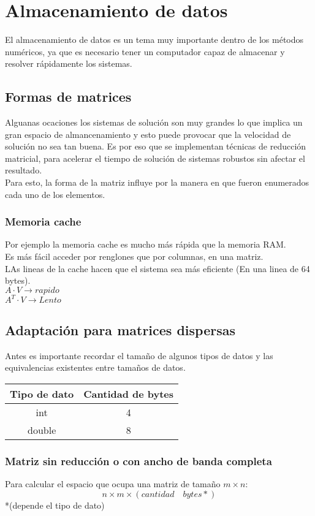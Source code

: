 \chapter{Almacenamiento de datos }
El almacenamiento de datos es un tema muy importante dentro de los m\'etodos num\'ericos, ya que es necesario tener un computador capaz de almacenar y resolver r\'apidamente los sistemas.

\section{Formas de matrices}
Alguanas ocaciones los sistemas de soluci\'on son muy grandes lo que implica un gran espacio de almancenamiento y esto puede provocar que la velocidad de soluci\'on no sea tan buena. Es por eso que se implementan t\'ecnicas de reducci\'on matricial, para acelerar el tiempo de soluci\'on de sistemas robustos sin afectar el resultado.\\
Para esto, la forma de la matriz influye por la manera en que fueron enumerados cada uno de los elementos.

\subsection{Memoria cache}
Por ejemplo la memoria cache es mucho m\'as r\'apida que la memoria RAM.\\
Es m\'as f\'acil acceder por renglones que por columnas, en una matriz.\\
LAs lineas de la cache hacen que el sistema sea más eficiente (En una linea de 64 bytes).\\
$A\cdot V \rightarrow rapido$\\
$A^T\cdot V\rightarrow Lento$

\section{Adaptaci\'on para matrices dispersas}
Antes es importante recordar el tamaño de algunos tipos de datos y las equivalencias existentes entre tamaños de datos. 
\begin{tabular}{| c | c |}
\hline
Tipo de dato & Cantidad de bytes \\
\hline
int & 4 \\
double & 8\\
\hline
\end{tabular}
\subsection{Matriz sin reducci\'on o con ancho de banda completa}
Para calcular el espacio que ocupa una matriz de tamaño $m \times n$:
\begin{displaymath}
n\times m\times (cantidad\quad bytes*)
\end{displaymath}
*(depende el tipo de dato) 

